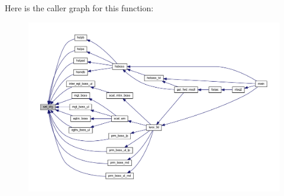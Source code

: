 Here is the caller graph for this function\+:\nopagebreak
\begin{figure}[H]
\begin{center}
\leavevmode
\includegraphics[width=350pt]{Leroi_8f90_a8e7ce2c7dc3e5ee45a8adefc6e6bba97_icgraph}
\end{center}
\end{figure}
\mbox{\label{Leroi_8f90_a27d896475f3529fb2188ec4474b27717}} 
